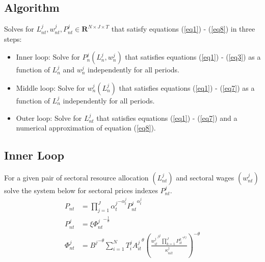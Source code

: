 \documentclass[11pt,oneside,a4paper]{article}
\begin{document}
\subsection{Algorithm}
Solves for $L_{nt}^j, w_{nt}^j, P_{nt}^j \in \mathbf{R}^{N \times J \times T}$ that satisfy equations (\ref{eq1}) - (\ref{eq8}) in three steps:
\begin{itemize}
  \item Inner loop: Solve for $P_{n}^j\!\left(L_{n}^j, w_{n}^j\right)$ that satisfies equations (\ref{eq1}) - (\ref{eq3}) as a function of $L_{n}^j$ and $w_{n}^j$ independently for all periods.
  \item Middle loop: Solve for $w_{n}^j\!\left(L_{n}^j\right)$ that satisfies equations (\ref{eq1}) - (\ref{eq7}) as a function of $L_{n}^j$ independently for all periods.
  \item Outer loop: Solve for $L_{nt}^j$ that satisfies equations (\ref{eq1}) - (\ref{eq7}) and a numerical approximation of equation (\ref{eq8}). 
\end{itemize}

\newpage
\subsection{Inner Loop}
For a given pair of sectoral resource allocation $(L_{nt}^j)$ and sectoral wages $(w_{nt}^j)$ solve the system below for sectoral prices indexes $P_{nt}^j.$
\begin{align*}
P_{nt} &= \prod_{j = 1}^J {\alpha_t^j}^{- \alpha_t^j} {P_{nt}^j}^{\alpha_t^j} \\
%
P_{nt}^j &= \xi {\Phi_{nt}^j}^{-\frac{1}{\theta}}\\
%
\Phi_{nt}^j &= {B^j}^{-\theta} \sum_{i = 1}^N T_i^j {A_{it}^j}^{\theta} \left(\frac{{w_{it}^j}^{\beta^j} \prod_{k = 1}^{J}{P_{it}^k}^{\gamma^{kj}} }{\kappa_{nit}^j}\right)^{-\theta}  
\end{align*}
\end{document}
